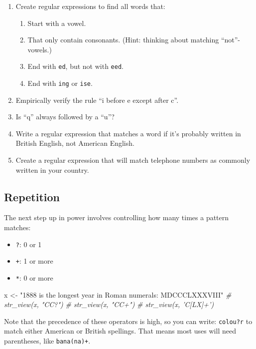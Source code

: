 \documentclass[]{book}
\newenvironment{Shaded}{\begin{snugshade}}{\end{snugshade}}
\newcommand{\StringTok}[1]{\textcolor[rgb]{0.31,0.60,0.02}{{#1}}}
\newcommand{\CommentTok}[1]{\textcolor[rgb]{0.56,0.35,0.01}{\textit{{#1}}}}
\newcommand{\NormalTok}[1]{{#1}}
\providecommand{\tightlist}{%
  \setlength{\itemsep}{0pt}\setlength{\parskip}{0pt}}
\begin{document}
\begin{enumerate}
\def\labelenumi{\arabic{enumi}.}
\item
  Create regular expressions to find all words that:

  \begin{enumerate}
  \def\labelenumii{\arabic{enumii}.}
  \item
    Start with a vowel.
  \item
    That only contain consonants. (Hint: thinking about matching
    ``not''-vowels.)
  \item
    End with \texttt{ed}, but not with \texttt{eed}.
  \item
    End with \texttt{ing} or \texttt{ise}.
  \end{enumerate}
\item
  Empirically verify the rule ``i before e except after c''.
\item
  Is ``q'' always followed by a ``u''?
\item
  Write a regular expression that matches a word if it's probably
  written in British English, not American English.
\item
  Create a regular expression that will match telephone numbers as
  commonly written in your country.
\end{enumerate}

\subsection{Repetition}\label{repetition}

The next step up in power involves controlling how many times a pattern
matches:

\begin{itemize}
\tightlist
\item
  \texttt{?}: 0 or 1
\item
  \texttt{+}: 1 or more
\item
  \texttt{*}: 0 or more
\end{itemize}

\begin{Shaded}
\begin{Highlighting}[]
\NormalTok{x <-}\StringTok{ "1888 is the longest year in Roman numerals: MDCCCLXXXVIII"}
\CommentTok{# str_view(x, "CC?")}
\CommentTok{# str_view(x, "CC+")}
\CommentTok{# str_view(x, 'C[LX]+')}
\end{Highlighting}
\end{Shaded}

Note that the precedence of these operators is high, so you can write:
\texttt{colou?r} to match either American or British spellings. That
means most uses will need parentheses, like \texttt{bana(na)+}.
\end{document}
